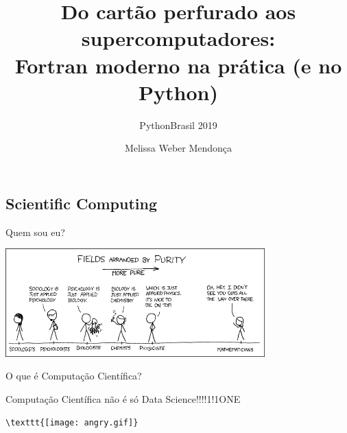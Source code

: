 \documentclass{beamer}
\title{\Large{Do cartão perfurado aos supercomputadores:\\
Fortran moderno na prática (e no Python)}}
\subtitle{PythonBrasil 2019}
\author{Melissa Weber Mendonça}
\begin{document}

\frame{\maketitle}

\begin{darkframes}
  \section{Scientific Computing}
  
  \begin{frame}{Quem sou eu?}
    \begin{center}
      \includegraphics[width=10cm]{figures/purity.png}
    \end{center}
  \end{frame}
  
  \begin{frame}[fragile]{O que é Computação Científica?}
    \begin{center}
      \alert{Computação Científica não é só Data Science!!!!1!1ONE}
    \end{center}
    \vfill
    \begin{center}
      \verb+\texttt{[image: angry.gif]}+
    \end{center}
  \end{frame}
  

\end{darkframes}
\end{document}
